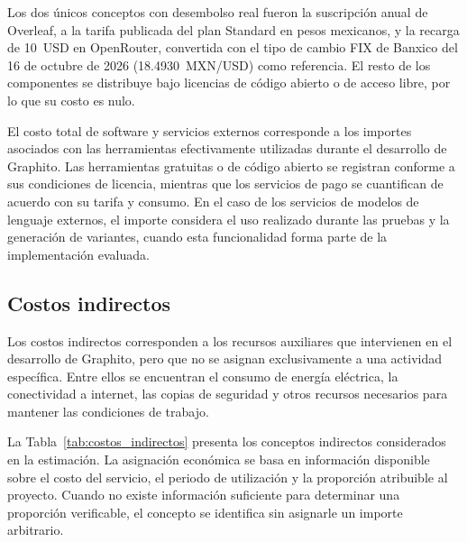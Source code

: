 Los dos únicos conceptos con desembolso real fueron la suscripción anual de Overleaf, a la tarifa publicada del plan Standard en pesos mexicanos, y la recarga de 10~USD en OpenRouter, convertida con el tipo de cambio FIX de Banxico del 16 de octubre de 2026 (18.4930~MXN/USD) como referencia. El resto de los componentes se distribuye bajo licencias de código abierto o de acceso libre, por lo que su costo es nulo.

El costo total de software y servicios externos corresponde a los importes asociados con las herramientas efectivamente utilizadas durante el desarrollo de Graphito. Las herramientas gratuitas o de código abierto se registran conforme a sus condiciones de licencia, mientras que los servicios de pago se cuantifican de acuerdo con su tarifa y consumo. En el caso de los servicios de modelos de lenguaje externos, el importe considera el uso realizado durante las pruebas y la generación de variantes, cuando esta funcionalidad forma parte de la implementación evaluada.

\subsection{Costos indirectos}

Los costos indirectos corresponden a los recursos auxiliares que intervienen en el desarrollo de Graphito, pero que no se asignan exclusivamente a una actividad específica. Entre ellos se encuentran el consumo de energía eléctrica, la conectividad a internet, las copias de seguridad y otros recursos necesarios para mantener las condiciones de trabajo.

La Tabla~\ref{tab:costos_indirectos} presenta los conceptos indirectos considerados en la estimación. La asignación económica se basa en información disponible sobre el costo del servicio, el periodo de utilización y la proporción atribuible al proyecto. Cuando no existe información suficiente para determinar una proporción verificable, el concepto se identifica sin asignarle un importe arbitrario.

